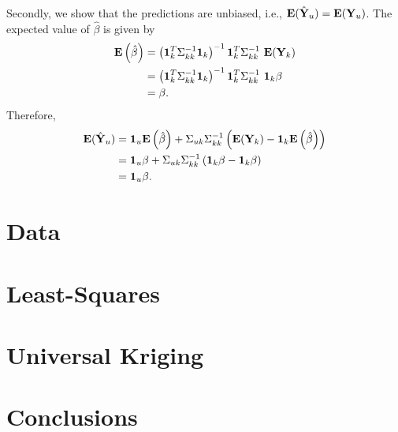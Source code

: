 \documentclass[a4paper,10pt]{article}
\def\bY{{\bf Y}}
\def\bE{{\bf E}}
\def\b1{{\bf 1}}
\begin{document}
Secondly, we show that the predictions are unbiased, i.e., $\bE(\hat \bY_u) = \bE(\bY_u)$. The expected value of $\hat \beta$ is given by
\begin{align*}
 \bE \left( \hat \beta \right) &= \left( \b1_k^T \Sigma_{kk}^{-1} \b1_k \right)^{-1} \b1_k^T \Sigma_{kk}^{-1} ~ \bE (\bY_k) \\
  &= \left( \b1_k^T \Sigma_{kk}^{-1} \b1_k \right)^{-1} \b1_k^T \Sigma_{kk}^{-1} ~ \b1_k \beta \\
  &= \beta.
\end{align*}
Therefore,
\begin{align*}
 \bE(\hat \bY_u) &=  \b1_u \bE\left(\hat \beta \right) + \Sigma_{uk} \Sigma_{kk}^{-1}\left( \bE(\bY_k) - \b1_k \bE \left(\hat \beta \right)\right) \\
 &= \b1_u \beta + \Sigma_{uk} \Sigma_{kk}^{-1}\left( \b1_k \beta - \b1_k \beta \right) \\
 &= \b1_u \beta.
\end{align*}

\section{Data}

\section{Least-Squares}

\section{Universal Kriging}

\section{Conclusions}
\end{document}
